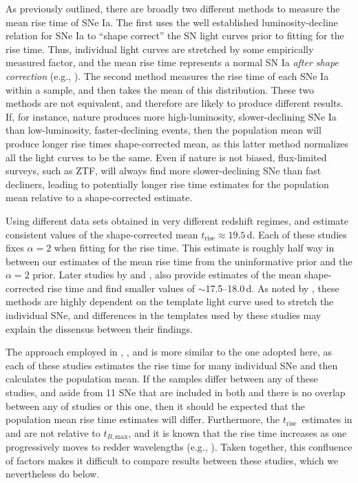 \documentclass[twocolumn]{./aastex63}
\newcommand{\trise}{$t_\mathrm{rise}$}
\newcommand{\tbmax}{$t_{B,\mathrm{max}}$}
\begin{document}
As previously outlined, there are broadly two different methods to measure the
mean rise time of SNe Ia. The first uses the well established
luminosity-decline relation for SNe Ia \citep{Phillips93} to ``shape correct''
the SN light curves prior to fitting for the rise time. Thus, individual light
curves are stretched by some empirically measured factor, and the mean rise
time represents a normal SN Ia \textit{after shape correction} (e.g.,
\citealt{Riess99a,Conley06,Hayden10,Ganeshalingam11}). The second method
measures the rise time of each SNe Ia within a sample, and then takes the mean
of this distribution. These two methods are not equivalent, and therefore are
likely to produce different results. If, for instance, nature produces more
high-luminosity, slower-declining SNe Ia than low-luminosity, faster-declining
events, then the population mean will produce longer rise times
shape-corrected mean, as this latter method normalizes all the light curves to
be the same. Even if nature is not biased, flux-limited surveys, such as ZTF,
will always find more slower-declining SNe than fast decliners, leading to
potentially longer rise time estimates for the population mean relative to a
shape-corrected estimate.

Using different data sets obtained in very different redshift regimes,
\citet{Riess99a} and \citet{Conley06} estimate consistent values of the
shape-corrected mean \trise$ \approx 19.5$\,d. Each of these studies fixes
$\alpha = 2$ when fitting for the rise time. This estimate is roughly half way
in between our estimates of the mean rise time from the uninformative prior
and the $\alpha = 2$ prior. Later studies by \citet{Hayden10} and
\citet{Ganeshalingam11}, also provide estimates of the mean shape-corrected
rise time and find smaller values of $\sim$17.5--18.0\,d. As noted by
\citeauthor{Hayden10}, these methods are highly dependent on the template
light curve used to stretch the individual SNe, and differences in the
templates used by these studies may explain the dissensus between their
findings.

The approach employed in \citet{Zheng17a}, \citet{Papadogiannakis19}, and
\citet{Firth15} is more similar to the one adopted here, as each of these
studies estimates the rise time for many individual SNe and then calculates the
population mean. If the samples differ between any of these studies, and aside
from 11 SNe that are included in both \citet{Papadogiannakis19} and
\citet{Firth15} there is no overlap between any of studies or this one, then it
should be expected that the population mean rise time estimates will differ.
Furthermore, the \trise\ estimates in \citet{Papadogiannakis19} and
\citet{Firth15} are not relative to \tbmax, and it is known that the rise time
increases as one progressively moves to redder wavelengths (e.g.,
\citealt{Ganeshalingam11}). Taken together, this confluence of factors makes it
difficult to compare results between these studies, which we nevertheless do
below.
\end{document}
